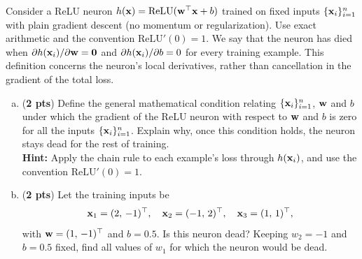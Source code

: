 \documentclass[11pt]{exam}
\begin{document}
\begin{enumerate}[1.]
 Consider a ReLU neuron $h({\bf x}) = \text{ReLU}({\bf w}^\top {\bf x} + b)$ trained on fixed inputs $\{{\bf x}_i\}_{i=1}^n$ with plain gradient descent (no momentum or regularization). Use exact arithmetic and the convention $\text{ReLU}'(0) = 1$. We say that the neuron has died when $\partial h({\bf x}_i)/\partial {\bf w} = {\bf 0}$ and $\partial h({\bf x}_i)/\partial b = 0$ for every training example. This definition concerns the neuron's local derivatives, rather than cancellation in the gradient of the total loss.
 \begin{enumerate}[(a)]
    \item ({\bf 2 pts}) Define the general mathematical condition relating $\{{\bf x}_i\}_{i=1}^n$, ${\bf w}$ and $b$ under which the gradient of the ReLU neuron with respect to ${\bf w}$ and $b$ is zero for all the inputs $\{{\bf x}_i\}_{i=1}^n$. Explain why, once this condition holds, the neuron stays dead for the rest of training.\\
    {\bf Hint:} Apply the chain rule to each example's loss through $h({\bf x}_i)$, and use the convention $\text{ReLU}'(0) = 1$.
    \begin{tcolorbox}
\vspace{55ex}
\end{tcolorbox}
\newpage
    \item ({\bf 2 pts}) Let the training inputs be
    \[
    {\bf x}_1 = (2,\, -1)^\top, \quad {\bf x}_2 = (-1,\, 2)^\top, \quad {\bf x}_3 = (1,\, 1)^\top,
    \]
    with ${\bf w} = (1,\, -1)^\top$ and $b = 0.5$. Is this neuron dead? Keeping $w_2 = -1$ and $b = 0.5$ fixed, find all values of $w_1$ for which the neuron would be dead.
    \begin{tcolorbox}
\vspace{45ex}
\end{tcolorbox}
 \end{enumerate}



\end{enumerate}
\end{document}

